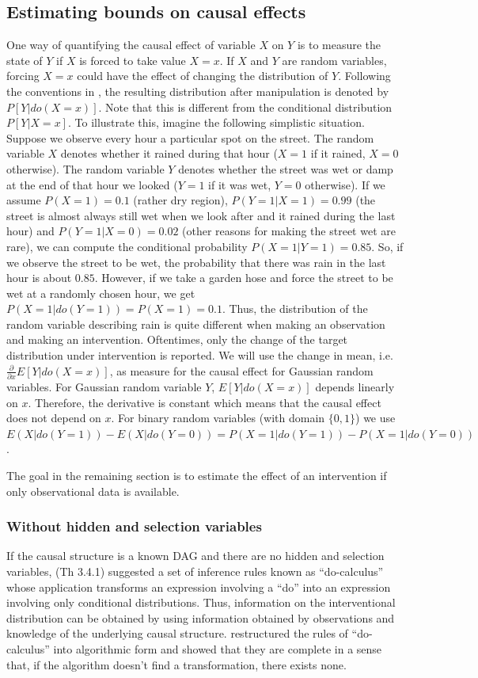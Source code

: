 \documentclass[article]{jss}
\begin{document}
\subsection{Estimating bounds on causal effects}
One way of quantifying the causal effect of variable $X$ on $Y$ is to
measure the state of $Y$ if $X$ is forced to take value $X=x$. If $X$ and
$Y$ are random variables, forcing $X=x$ could have the effect of changing
the distribution of $Y$. Following the conventions in \cite{Pearl00}, the resulting
distribution after manipulation is denoted by $P[Y | do(X=x)]$. Note that
this is different from the conditional distribution $P[Y | X=x]$. To
illustrate this, imagine the following simplistic situation. Suppose we
observe every hour a particular spot on the street. The random variable $X$
denotes whether it rained during that hour ($X=1$ if it rained, $X=0$
otherwise). The random variable $Y$ denotes whether the street was wet or
damp at the end of that hour we looked ($Y=1$ if it was wet, $Y=0$
otherwise). If we assume $P(X=1) = 0.1$ (rather dry region), $P(Y=1|X=1) =
0.99$ (the street is almost always still wet when we look after and it
rained during the last hour) and $P(Y=1|X=0) = 0.02$ (other reasons for
making the street wet are rare), we can compute the conditional probability
$P(X=1|Y=1) = 0.85$. So, if we observe the street to be wet, the
probability that there was rain in the last hour is about $0.85$. However,
if we take a garden hose and force the street to be wet at a randomly
chosen hour, we get $P(X=1|do(Y=1)) = P(X=1) = 0.1$. Thus, the distribution
of the random variable describing rain is quite different when making an
observation and making an intervention.  Oftentimes, only the change of the
target distribution under intervention is reported. We will use the change
in mean, i.e. $\frac{\partial}{\partial x} E[Y|do(X=x)]$, as measure for
the causal effect for Gaussian random variables. For Gaussian random
variable $Y$, $E[Y|do(X=x)]$ depends linearly on $x$. Therefore, the
derivative is constant which means that the causal effect does not depend
on $x$. For binary random variables (with domain $\{0,1\}$) we use
$E(X|do(Y=1)) - E(X|do(Y=0)) = P(X=1|do(Y=1)) - P(X=1|do(Y=0))$.

The goal in the remaining section is to estimate the effect of an
intervention if only observational data is available. 
\subsubsection{Without hidden and selection variables}
If the causal structure is a known DAG and there are no hidden and
selection variables, \cite{Pearl00} (Th 3.4.1) suggested a set of inference rules
known as ``do-calculus'' whose
application transforms an expression involving a ``do'' into an expression
involving only conditional distributions. Thus, information on the
interventional distribution can be obtained by using information obtained
by observations and knowledge of the underlying causal structure. \cite{shpitser}
restructured the rules of ``do-calculus'' into algorithmic form and showed
that they are complete in a sense that, if the algorithm doesn't find a
transformation, there exists none.
\end{document}
